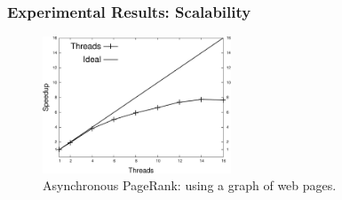 \documentclass{beamer}
\begin{document}
\begin{frame}[fragile]
   \frametitle{Experimental Results: Scalability}
   \begin{figure}[b]
      \includegraphics[width=0.5\textwidth]{speedup_pagerank-search_engines.pdf}
      \caption{Asynchronous PageRank: using a graph of web pages.}
   \end{figure}
\end{frame}
\end{document}
